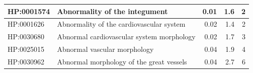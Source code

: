\documentclass[
]{article}
\begin{document}
\begin{table}
{\begin{tabular}[t]{l|l|r|r|r}
\hline
\hspace{1em}HP:0001574 & Abnormality of the integument & 0.01 & 1.6 & 2\\
\hline
\hspace{1em}HP:0001626 & Abnormality of the cardiovascular system & 0.02 & 1.4 & 2\\
\hline
\hspace{1em}HP:0030680 & Abnormal cardiovascular system morphology & 0.02 & 1.7 & 3\\
\hline
\hspace{1em}HP:0025015 & Abnormal vascular morphology & 0.04 & 1.9 & 4\\
\hline
\hspace{1em}HP:0030962 & Abnormal morphology of the great vessels & 0.04 & 2.7 & 6\\
\hline
\end{tabular}

}

\end{table}%

\newpage
\end{document}
